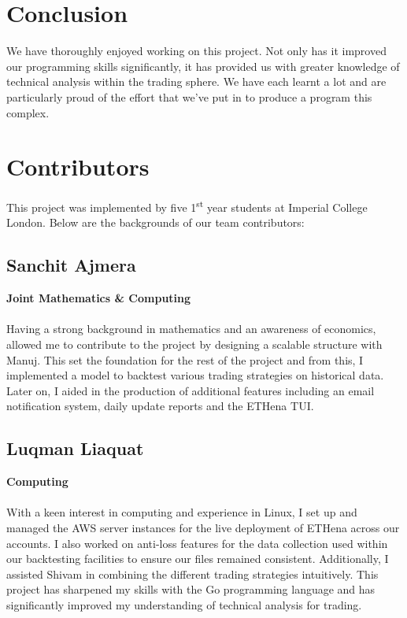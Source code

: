 \documentclass[12pt]{article}
\begin{document}
\begin{multicols}{2}
    \section{Conclusion}
    We have thoroughly enjoyed working on this project. Not only has it improved our programming skills significantly, it has provided us with greater knowledge of technical analysis within the trading sphere. We have each learnt a lot and are particularly proud of the effort that we've put in to produce a program this complex.


    \section{Contributors}
    This project was implemented by five 1\textsuperscript{st} year students at Imperial College London. Below are the backgrounds of our team contributors:
    \\
    \subsection{Sanchit Ajmera}
    \vspace{-0.375cm}\textbf{\footnotesize{Joint Mathematics \& Computing}} \\ \\
    Having a strong background in mathematics and an awareness of economics, allowed me to contribute to the project by designing a scalable structure with Manuj. This set the foundation for the rest of the project and from this, I implemented a model to backtest various trading strategies on historical data. Later on, I aided in the production of additional features including an email notification system, daily update reports and the ETHena TUI.

    \subsection{Luqman Liaquat}
    \vspace{-0.375cm}\textbf{\footnotesize{Computing}} \\ \\
    With a keen interest in computing and experience in Linux, I set up and managed the AWS server instances for the live deployment of ETHena across our accounts. I also worked on anti-loss features for the data collection used within our backtesting facilities to ensure our files remained consistent. Additionally, I assisted Shivam in combining the different trading strategies intuitively. This project has sharpened my skills with the Go programming language and has significantly improved my understanding of technical analysis for trading.


\end{multicols}
\end{document}
